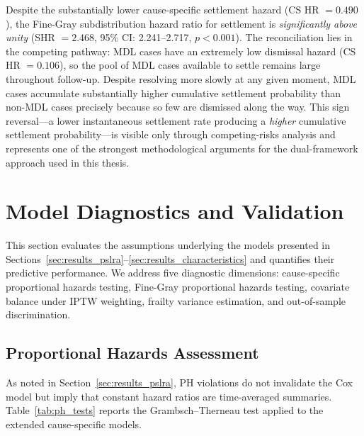 Despite the substantially lower cause-specific
settlement hazard (CS HR $= 0.490$), the Fine-Gray
subdistribution hazard ratio for settlement is
\emph{significantly above unity} (SHR $= 2.468$,
95\% CI: 2.241--2.717, $p < 0.001$). The reconciliation
lies in the competing pathway: MDL cases have an
extremely low dismissal hazard (CS HR $= 0.106$), so the
pool of MDL cases available to settle remains large
throughout follow-up. Despite resolving more slowly at any
given moment, MDL cases accumulate substantially higher
cumulative settlement probability than non-MDL cases
precisely because so few are dismissed along the way. This
sign reversal---a lower instantaneous settlement rate
producing a \emph{higher} cumulative settlement
probability---is visible only through competing-risks
analysis and represents one of the strongest
methodological arguments for the dual-framework approach
used in this thesis.


\section{Model Diagnostics and Validation}
\label{sec:results_diagnostics}

This section evaluates the assumptions underlying the
models presented in
Sections~\ref{sec:results_pslra}--\ref{sec:results_characteristics}
and quantifies their predictive performance. We address
five diagnostic dimensions: cause-specific proportional
hazards testing, Fine-Gray proportional hazards testing,
covariate balance under IPTW weighting, frailty variance
estimation, and out-of-sample discrimination.

\subsection{Proportional Hazards Assessment}
\label{subsec:ph_diagnostics}

As noted in Section~\ref{sec:results_pslra}, PH violations
do not invalidate the Cox model but imply that constant
hazard ratios are time-averaged summaries.
Table~\ref{tab:ph_tests} reports the Grambsch--Therneau test
applied to the extended cause-specific models.

